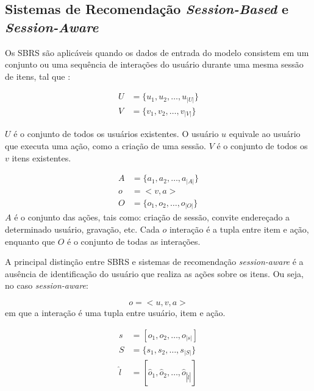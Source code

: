\subsection{Sistemas de Recomendação \textit{Session-Based} e \textit{Session-Aware}}

Os SBRS são aplicáveis quando os dados
 de entrada do modelo consistem em um conjunto ou uma sequência de interações do usuário
 durante uma mesma sessão de itens, tal que \cite{survey_wang_2021}:

 \begin{equation*}
  \begin{aligned}
  U & = \{u_1, u_2, \ldots, u_{|U|}\} \\
  V & = \{v_1, v_2, \ldots, v_{|V|}\}
\end{aligned}
\end{equation*}

$U$ é o conjunto de todos os usuários existentes. O usuário $u$ equivale ao
usuário que executa uma ação, como a criação de uma sessão. $V$ é o conjunto de
todos os $v$ itens existentes.

\begin{equation*}
  \begin{aligned}
  A & = \{a_1, a_2, \ldots, a_{|A|}\} \\
  o & = <v, a> \\
  O & = \{o_1, o_2, \ldots, o_{|O|}\}
  \end{aligned}
  \end{equation*}
$A$ é o conjunto das ações, tais como: criação de sessão, convite endereçado a
  determinado usuário, gravação, etc. Cada $o$ interação é a tupla entre item e
  ação, enquanto que $O$ é o conjunto de todas as interações.

  A principal distinção entre SBRS e sistemas de recomendação \textit{session-aware}
  é a ausência de identificação do usuário que realiza as ações sobre os itens.
  Ou seja, no caso \textit{session-aware}:

  \begin{equation}
    o = <u, v, a>
    \end{equation}
  em que a interação é uma tupla entre usuário, item e ação.

  \begin{equation*}
  \begin{aligned}
  s & = [o_1, o_2, \ldots, o_{|s|}] \\
  S & = \{s_1, s_2, \ldots, s_{|S|}\} \\
  \hat{l} & = [\hat{o}_1, \hat{o}_2, \ldots, \hat{o}_{|\hat{l}|}]
  \end{aligned}
  \end{equation*}
  
